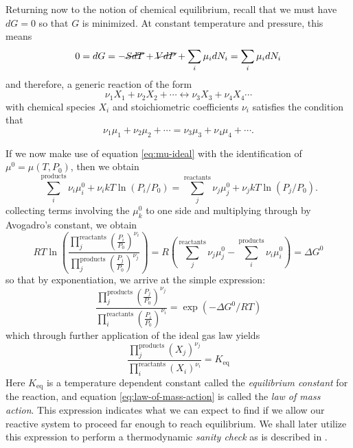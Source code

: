Returning now to the notion of chemical equilibrium, recall that we must have $dG=0$ so that $G$ is minimized. At constant temperature and pressure, this means
\begin{equation}
  0 = dG = -\cancel{SdT} + \cancel{VdP} + \sum_i \mu_i dN_i = \sum_i\mu_i dN_i
\end{equation}
and therefore, a generic reaction of the form
\begin{equation}
  \nu_1X_1 + \nu_2X_2 + \cdots \leftrightarrow \nu_3 X_3 + \nu_4 X_4 \cdots
\end{equation}
with chemical species $X_i$ and stoichiometric coefficients $\nu_i$ satisfies the condition that
\begin{equation}
  \nu_1\mu_1 + \nu_2\mu_2 + \cdots = \nu_3\mu_3 + \nu_4\mu_4 + \cdots.
\end{equation}

If we now make use of equation \ref{eq:mu-ideal} with the identification of $\mu^0 = \mu(T,P_0)$, then we obtain
\begin{equation}
  \sum_{i}^{\text{products}}\nu_i\mu_i^0 + \nu_i kT\ln(P_i/P_0) = \sum_{j}^{\text{reactants}} \nu_j\mu_j^0 + \nu_j kT\ln(P_j/P_0).
\end{equation}
collecting terms involving the $\mu^0_k$ to one side and multiplying through by Avogadro's constant, we obtain
\begin{equation}
  RT\ln\left(\frac{\prod\limits_j^{\text{reactants}}\left(\frac{P_i}{P_0}\right)^{\nu_i}}{\prod\limits_j^{\text{products}}\left(\frac{P_j}{P_0}\right)^{\nu_j}}\right) = R\left(\sum_j^{\text{reactants}}\nu_j\mu_j^0 -  \sum_i^{\text{products}} \nu_i\mu_i^0\right) = \Delta G^0
\end{equation}
so that by exponentiation, we arrive at the simple expression:
\begin{equation}
  \frac{\prod\limits_j^{\text{products}}\left(\frac{P_j}{P_0}\right)^{\nu_j}}{\prod\limits_i^{\text{reactants}}\left(\frac{P_i}{P_0}\right)^{\nu_i}} = \exp(-\Delta G^0/RT)
\end{equation}
which through further application of the ideal gas law yields
\begin{equation}
  \label{eq:law-of-mass-action}
  \boxed{\frac{\prod\limits_j^{\text{products}}\left(X_j\right)^{\nu_j}}{\prod\limits_i^{\text{reactants}}\left(X_i\right)^{\nu_i}} = K_{\text{eq}}}
\end{equation}
Here $K_{\text{eq}}$ is a temperature dependent constant called the \textit{equilibrium constant} for the reaction, and equation \ref{eq:law-of-mass-action} is called the \textit{law of mass action}. This expression indicates what we can expect to find if we allow our reactive system to proceed far enough to reach equilibrium. We shall later utilize this expression to perform a thermodynamic \textit{sanity check} as is described in \cite{boldi-thesis}. 


